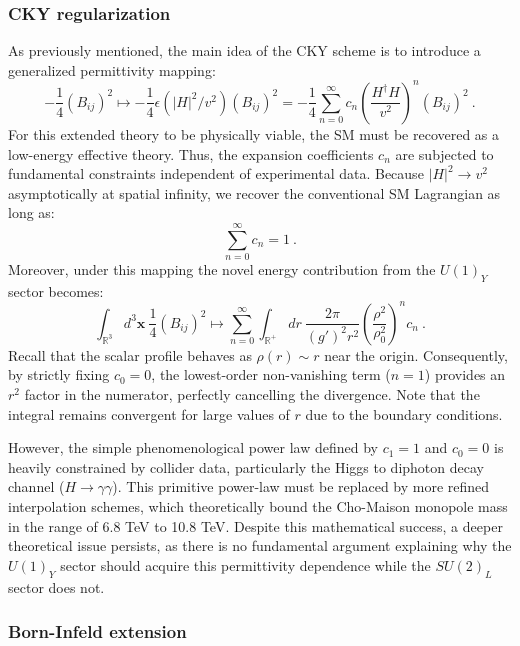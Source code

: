 \documentclass[a4paper,11pt]{article}
\begin{document}
\subsubsection{CKY regularization}
As previously mentioned, the main idea of the CKY scheme is to introduce a generalized permittivity mapping:
\begin{equation}
    -\frac{1}{4} (B_{ij})^2\mapsto -\frac{1}{4}\epsilon(|H|^2/v^2)(B_{ij})^2= -\frac{1}{4}\sum_{n=0}^{\infty} c_n \left(\frac{H^\dagger H}{v^2} \right)^n(B_{ij})^2\ .
\end{equation}
For this extended theory to be physically viable, the SM must be recovered as a low-energy effective theory. Thus, the expansion coefficients $c_n$ are subjected to fundamental constraints independent of experimental data. Because $|H|^2 \to v^2$ asymptotically at spatial infinity, we recover the conventional SM Lagrangian as long as:
\begin{equation}
    \sum_{n=0}^{\infty}c_n=1\ .
\end{equation}
Moreover, under this mapping the novel energy contribution from the $U(1)_Y$ sector becomes:
\begin{equation}
    \int_{\mathbb R^3} d^3\boldsymbol x\ \frac{1}{4}(B_{ij})^2\mapsto \sum_{n=0}^{\infty} \int_{\mathbb R^+}dr\ \frac{2\pi}{(g')^2 r^2}\left(\frac{\rho^2}{\rho_0^2} \right)^n c_n\ .
\end{equation}
Recall that the scalar profile behaves as $\rho(r) \sim r$ near the origin. Consequently, by strictly fixing $c_0 = 0$, the lowest-order non-vanishing term ($n=1$) provides an $r^2$ factor in the numerator, perfectly cancelling the divergence. Note that the integral remains convergent for large values of $r$ due to the boundary conditions.

However, the simple phenomenological power law defined by $c_1=1$ and $c_0=0$ is heavily constrained by collider data, particularly the Higgs to diphoton decay channel ($H \to \gamma\gamma$). This primitive power-law must be replaced by more refined interpolation schemes, which theoretically bound the Cho-Maison monopole mass in the range of 6.8 TeV to 10.8 TeV. Despite this mathematical success, a deeper theoretical issue persists, as there is no fundamental argument explaining why the $U(1)_Y$ sector should acquire this permittivity dependence while the $SU(2)_L$ sector does not.
\subsubsection{Born-Infeld extension}
\end{document}
